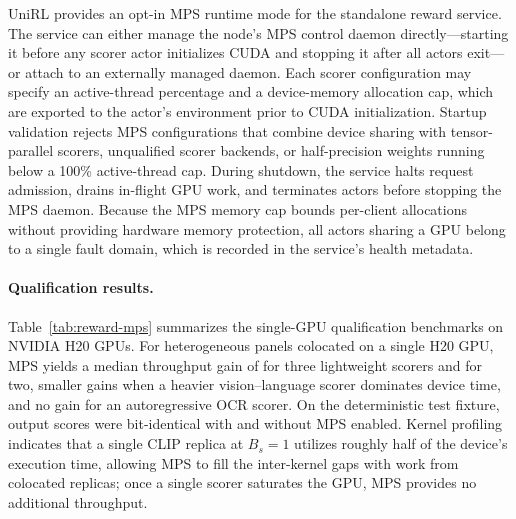 UniRL provides an opt-in MPS runtime mode for the standalone reward service.
The service can either manage the node's MPS control daemon directly---starting it before any scorer actor initializes CUDA and stopping it after all actors exit---or attach to an externally managed daemon.
Each scorer configuration may specify an active-thread percentage and a device-memory allocation cap, which are exported to the actor's environment prior to CUDA initialization.
Startup validation rejects MPS configurations that combine device sharing with tensor-parallel scorers, unqualified scorer backends, or half-precision weights running below a 100\% active-thread cap.
During shutdown, the service halts request admission, drains in-flight GPU work, and terminates actors before stopping the MPS daemon.
Because the MPS memory cap bounds per-client allocations without providing hardware memory protection, all actors sharing a GPU belong to a single fault domain, which is recorded in the service's health metadata.

\begin{table}[H]
\caption{Throughput gain (\%) of NVIDIA MPS over fractional GPU colocation without MPS for two or three replicas of a single scorer on one NVIDIA H20 GPU; $B_s$ denotes the scorer batch size. Dashes indicate batch sizes at which the scorer implementation does not execute a single batched forward pass.}
\label{tab:reward-mps}
\centering
\small

\end{table}

\paragraph{Qualification results.}
Table~\ref{tab:reward-mps} summarizes the single-GPU qualification benchmarks on NVIDIA H20 GPUs.
For heterogeneous panels colocated on a single H20 GPU, MPS yields a median throughput gain of \RSMpsThreeLight{} for three lightweight scorers and \RSMpsTwoLight{} for two, smaller gains when a heavier vision--language scorer dominates device time, and no gain for an autoregressive OCR scorer.
On the deterministic test fixture, output scores were bit-identical with and without MPS enabled.
Kernel profiling indicates that a single CLIP replica at $B_s{=}1$ utilizes roughly half of the device's execution time, allowing MPS to fill the inter-kernel gaps with work from colocated replicas; once a single scorer saturates the GPU, MPS provides no additional throughput.

